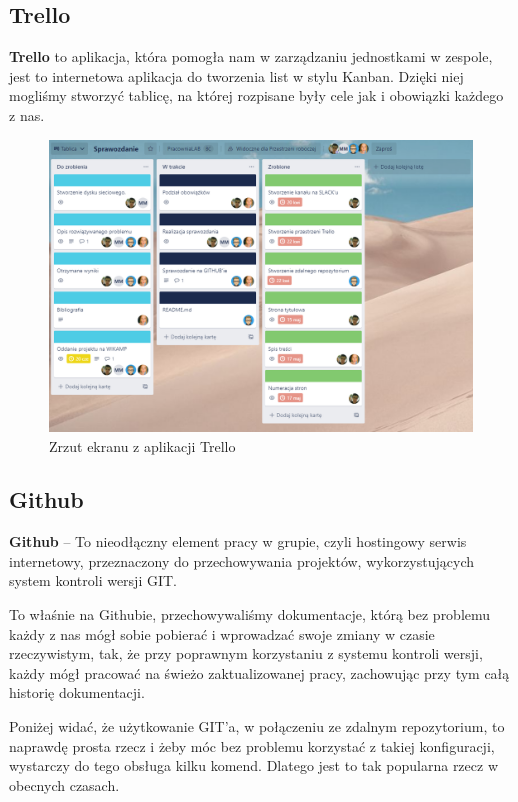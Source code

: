 \documentclass{article}
\begin{document}
		
		\subsection{Trello}

		\textbf{Trello} to aplikacja, która pomogła nam w zarządzaniu jednostkami w zespole, jest to internetowa aplikacja do tworzenia list w stylu Kanban. Dzięki niej mogliśmy stworzyć tablicę, na której rozpisane były cele jak i obowiązki każdego z nas. 
		
		\begin{figure}[!h]
			\centering
			\includegraphics[scale=0.45]{Trello.png}
			\caption{Zrzut ekranu z aplikacji Trello}
		\end{figure}
		
		\subsection{Github}
\textbf{Github} – To nieodłączny element pracy w grupie, czyli hostingowy serwis internetowy, przeznaczony do przechowywania projektów, wykorzystujących system kontroli wersji GIT. 

To właśnie na Githubie, przechowywaliśmy dokumentacje, którą bez problemu każdy z nas mógł sobie pobierać i wprowadzać swoje zmiany w czasie rzeczywistym, tak, że przy poprawnym korzystaniu z systemu kontroli wersji, każdy mógł pracować na świeżo zaktualizowanej pracy, zachowując przy tym całą historię dokumentacji. 

Poniżej widać, że użytkowanie GIT’a, w połączeniu ze zdalnym repozytorium, to naprawdę prosta rzecz i żeby móc bez problemu korzystać z takiej konfiguracji, wystarczy do tego obsługa kilku komend. Dlatego jest to tak popularna rzecz w obecnych czasach. 
\end{document}
